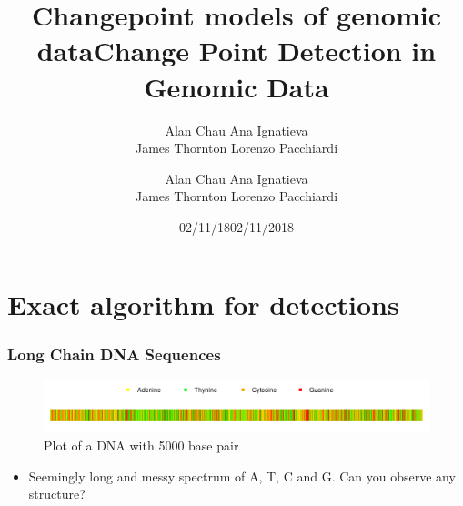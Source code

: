 \documentclass{beamer}
\title[Changepoints]{Changepoint models of genomic data}
\author[]{Alan Chau \hspace{0.4cm}Ana Ignatieva\hspace{0.4cm} \\
James Thornton\hspace{0.4cm} Lorenzo Pacchiardi} %
\institute{OxWaSP Module 2}
\date{02/11/18}
\begin{document}

\title[Change Point Detection]{Change Point Detection in Genomic Data} %

\author[]{Alan Chau \hspace{0.4cm}Ana Ignatieva\hspace{0.4cm} \\
James Thornton\hspace{0.4cm} Lorenzo Pacchiardi} %

\date{02/11/2018} %

\begin{frame}
\titlepage %
\end{frame}




\section{Exact algorithm for detections} %


\begin{frame}
\frametitle{Long Chain DNA Sequences}
    \begin{figure}[h]
        \centering
        \includegraphics[scale=0.4]{5000_DNA.png}        
        \caption{Plot of a DNA with 5000 base pair}
        \label{fig:my_label}
    \end{figure}
\begin{itemize}
    \item Seemingly long and messy spectrum of A, T, C and G. Can you observe any structure?
\end{itemize}
\end{frame}
\end{document}
